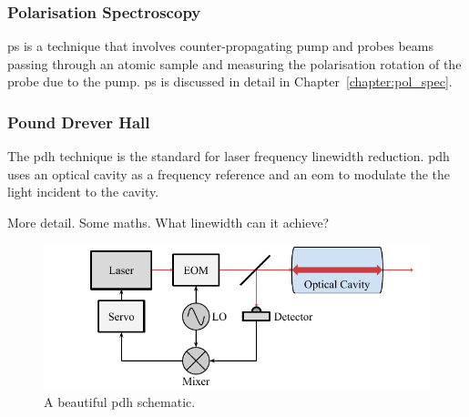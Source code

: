 \subsubsection{Polarisation Spectroscopy}
\Gls{ps} is a technique that involves counter-propagating pump and probes beams passing through an atomic sample and measuring the polarisation rotation of the probe due to the pump. \Gls{ps} is discussed in detail in Chapter~\ref{chapter:pol_spec}.

\subsubsection{Pound Drever Hall}

The \gls{pdh} technique is the standard for laser frequency linewidth reduction.\cite{drever_laser_1983}
\gls{pdh} uses an optical cavity as a frequency reference and an \gls{eom} to modulate the the light incident to the cavity.

More detail. Some maths. What linewidth can it achieve?\cite{ludlow_compact_2007}

\begin{figure}
\centering
\includegraphics{part1/Figs/PDH.pdf}
\caption{A beautiful \gls{pdh} schematic.}
\end{figure}




